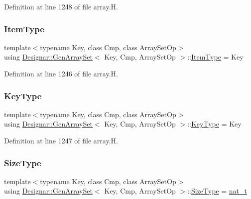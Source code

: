 Definition at line 1248 of file array.\+H.

\mbox{\label{class_designar_1_1_gen_array_set_a4db3cb71a2b2f88fee2a5f66688e5230}} 
\subsubsection{\texorpdfstring{Item\+Type}{ItemType}}
{\footnotesize\ttfamily template$<$typename Key, class Cmp, class Array\+Set\+Op$>$ \\
using \hyperlink{class_designar_1_1_gen_array_set}{Designar\+::\+Gen\+Array\+Set}$<$ Key, Cmp, Array\+Set\+Op $>$\+::\hyperlink{class_designar_1_1_gen_array_set_a4db3cb71a2b2f88fee2a5f66688e5230}{Item\+Type} =  Key}



Definition at line 1246 of file array.\+H.

\mbox{\label{class_designar_1_1_gen_array_set_a21195191743cf71430c939225a2c8d60}} 
\subsubsection{\texorpdfstring{Key\+Type}{KeyType}}
{\footnotesize\ttfamily template$<$typename Key, class Cmp, class Array\+Set\+Op$>$ \\
using \hyperlink{class_designar_1_1_gen_array_set}{Designar\+::\+Gen\+Array\+Set}$<$ Key, Cmp, Array\+Set\+Op $>$\+::\hyperlink{class_designar_1_1_gen_array_set_a21195191743cf71430c939225a2c8d60}{Key\+Type} =  Key}



Definition at line 1247 of file array.\+H.

\mbox{\label{class_designar_1_1_gen_array_set_aabe7047d492721160f291bf40ecf7745}} 
\subsubsection{\texorpdfstring{Size\+Type}{SizeType}}
{\footnotesize\ttfamily template$<$typename Key, class Cmp, class Array\+Set\+Op$>$ \\
using \hyperlink{class_designar_1_1_gen_array_set}{Designar\+::\+Gen\+Array\+Set}$<$ Key, Cmp, Array\+Set\+Op $>$\+::\hyperlink{class_designar_1_1_gen_array_set_aabe7047d492721160f291bf40ecf7745}{Size\+Type} =  \hyperlink{namespace_designar_aa72662848b9f4815e7bf31a7cf3e33d1}{nat\+\_\+t}}



